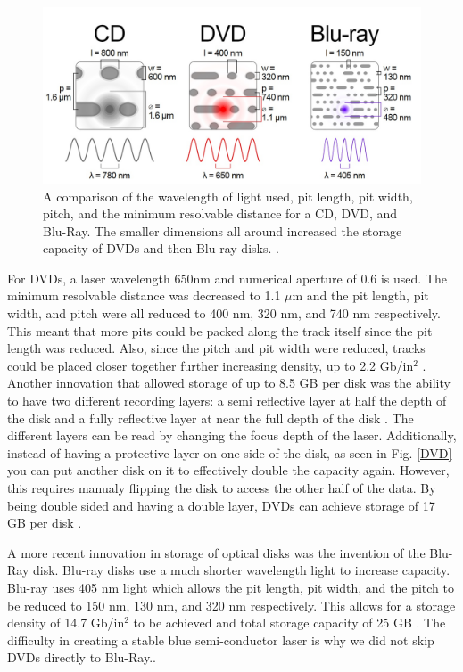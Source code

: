 \documentclass[ notitlepage, numerical, 11pt]{revtex4-1} %
\begin{document}
\begin{figure}[H]
\centerline{\includegraphics[scale=.55]{comparison.jpg}}
\caption{A comparison of the wavelength of light used, pit length, pit width, pitch, and the minimum resolvable distance for a CD, DVD, and Blu-Ray. The smaller dimensions all around increased the storage capacity of DVDs and then Blu-ray disks. \cite{wikiHolo}.}
\label{comparison}
\end{figure} 
For DVDs, a laser wavelength 650nm and numerical aperture of 0.6 is used. The minimum resolvable distance was decreased to 1.1 $\mu$m and the pit length, pit width, and pitch were all reduced to 400 nm, 320 nm, and 740 nm respectively. This meant that more pits could be packed along the track itself since the pit length was reduced. Also, since the pitch and pit width were reduced, tracks could be placed closer together further increasing density, up to 2.2 Gb/in$^2$ \cite{wikiHolo}. Another innovation that allowed storage of up to 8.5 GB per disk was the ability to have two different recording layers: a semi reflective layer at half the depth of the disk and a fully reflective layer at near the full depth of the disk \cite{memory}. 
The different layers can be read by changing the focus depth of the laser. Additionally, instead of having a protective layer on one side of the disk, as seen in Fig. \ref{DVD} you can put another disk on it to effectively double the capacity again. However, this requires manualy flipping the disk to access the other half of the data. By being double sided and having a double layer, DVDs can achieve storage of 17 GB per disk \cite{memory}.

A more recent innovation in storage of optical disks was the invention of the Blu-Ray disk. Blu-ray disks use a much shorter wavelength light to increase capacity. Blu-ray uses 405 nm light which allows the pit length, pit width, and the pitch to be reduced to 150 nm, 130 nm, and 320 nm respectively. This allows for a storage density of 14.7 Gb/in$^2$ to be achieved and total storage capacity of 25 GB \cite{memory}. The difficulty in creating a stable blue semi-conductor laser is why we did not skip DVDs directly to Blu-Ray..
\end{document}
